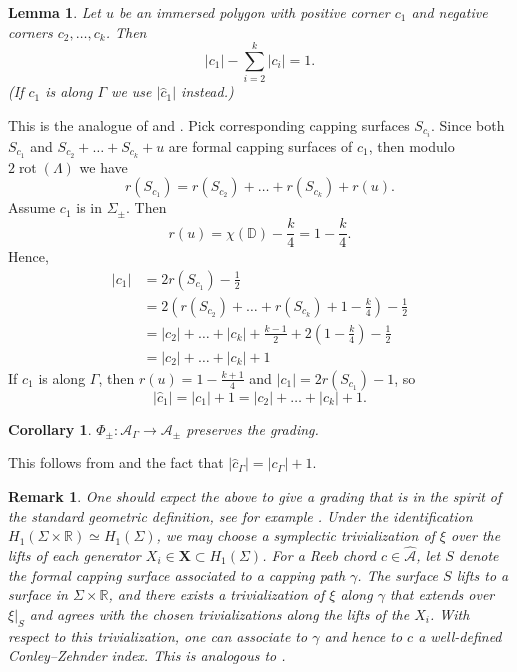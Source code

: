 \documentclass[11pt]{amsart}
\makeatletter
\renewenvironment{proof}[1][\proofname] {\par\pushQED{\qed}{\normalfont\bfseries\topsep6\p@\@plus6\p@\relax #1\@addpunct{.} }}{\popQED\endtrivlist\@endpefalse}
\theoremstyle{mystyle}
\newtheorem{lemma}[lemma]{Lemma}
\newtheorem{corollary}[corollary]{Corollary}
\newtheorem{remark}[remark]{Remark}
\newcommand{\R}{\mathbb{R}}
\newcommand{\<}{\langle}
\renewcommand{\>}{\rangle}
\DeclareMathOperator{\rot}{\text{rot}}
\makeatother
\begin{document}
\begin{lemma}\label{lem:diff=1}
	Let $u$ be an immersed polygon with positive corner $c_1$ and negative corners $c_2, \dots , c_k$. Then \[|c_1| - \sum_{i = 2}^k |c_i| = 1.\] (If $c_1$ is along $\Gamma$ we use $|\widehat{c}_1|$ instead.)
\end{lemma}

\begin{proof}
	This is the analogue of \cite[Lem. 6.3]{chekanov2002dga} and \cite[Thm 4.8]{licata2013seifert}. Pick corresponding capping surfaces $S_{c_i}$. Since both $S_{c_1}$ and $S_{c_2} + \dots  + S_{c_k} + u$ are formal capping surfaces of $c_1$, then modulo $2\rot(\Lambda)$ we have \[r(S_{c_1}) = r(S_{c_2}) + \dots  + r(S_{c_k}) + r(u).\] Assume $c_1$ is in $\Sigma_\pm$. Then \[r(u) = \chi(\mathbb{D}) - \frac{k}{4} = 1 - \frac{k}{4}.\] Hence, \begin{align*}
	    |c_1| &= 2r(S_{c_1}) - \frac{1}{2} \\
        &= 2\left(r(S_{c_2}) + \dots  + r(S_{c_k}) + 1 - \frac{k}{4}\right) - \frac{1}{2} \\
        &= |c_2| + \dots  + |c_k| + \frac{k-1}{2} + 2\left(1-\frac{k}{4}\right) - \frac{1}{2} \\
        &= |c_2| + \dots  + |c_k| + 1
	\end{align*} If $c_1$ is along $\Gamma$, then $r(u) = 1 - \frac{k+1}{4}$ and $|c_1| = 2r(S_{c_1}) - 1$, so \[|\widehat{c}_1| = |c_1| + 1 = |c_2| + \dots  + |c_k| + 1.\]
\end{proof}

\begin{corollary}\label{cor:phipmgrading}
    $\Phi_\pm: \mathcal{A}_\Gamma \rightarrow \mathcal{A}_\pm$ preserves the grading.
\end{corollary}

\begin{proof}
    This follows from  and the fact that $|\widehat{c}_\Gamma| = |c_\Gamma| + 1$.
\end{proof}

\begin{remark}\label{rem:geometric grading} One should expect the above to give a grading that is in the spirit of the standard geometric definition, see for example \cite[Sec. 1.6]{egh2000SFT}. Under the identification $H_1(\Sigma\times \R)\simeq H_1(\Sigma)$, we may choose a symplectic trivialization of $\xi$ over the lifts of each generator $X_i\in \mathbf{X}\subset H_1(\Sigma)$. For a Reeb chord $c\in \widehat{\mathcal{A}}$, let $S$ denote the formal capping surface associated to a capping path $\gamma$. The surface $S$ lifts to a surface in $\Sigma\times \R$, and there exists a trivialization of $\xi$ along $\gamma$ that extends over $\xi|_S$ and agrees with the chosen trivializations along the lifts of the $X_i$. With respect to this trivialization, one can associate to $\gamma$ and hence to $c$ a well-defined Conley–Zehnder index.  This is analogous to \cite[Rem. 4.4]{licata2013seifert}.
\end{remark}
\end{document}
